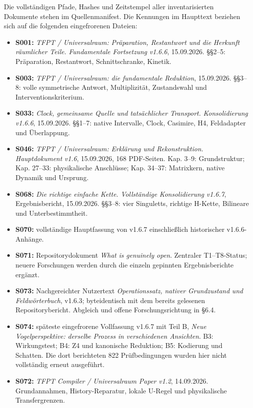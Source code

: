 Die vollständigen Pfade, Hashes und Zeitstempel aller inventarisierten
Dokumente stehen im Quellenmanifest. Die Kennungen im Haupttext beziehen
sich auf die folgenden eingefrorenen Dateien:

\begin{itemize}
\tightlist
\item
  \textbf{S001:} \emph{TFPT / Universalraum: Präparation, Restantwort
  und die Herkunft räumlicher Teile. Fundamentale Fortsetzung v1.6.6},
  15.09.2026. §§2--5: Präparation, Restantwort, Schnittschranke,
  Kinetik.
\item
  \textbf{S003:} \emph{TFPT / Universalraum: die fundamentale
  Reduktion}, 15.09.2026. §§3--8: volle symmetrische Antwort,
  Multiplizität, Zustandswahl und Interventionskriterium.
\item
  \textbf{S033:} \emph{Clock, gemeinsame Quelle und tatsächlicher
  Transport. Konsolidierung v1.6.6}, 15.09.2026. §§1--7: native
  Intervalle, Clock, Casimire, H4, Feldadapter und Überlappung.
\item
  \textbf{S046:} \emph{TFPT / Universalraum: Erklärung und
  Rekonstruktion. Hauptdokument v1.6}, 15.09.2026, 168 PDF-Seiten. Kap.
  3--9: Grundstruktur; Kap. 27--33: physikalische Anschlüsse; Kap.
  34--37: Matrixkern, native Dynamik und Ursprung.
\item
  \textbf{S068:} \emph{Die richtige einfache Kette. Vollständige
  Konsolidierung v1.6.7}, Ergebnisbericht, 15.09.2026. §§3--8: vier
  Singuletts, richtige H-Kette, Bilineare und Unterbestimmtheit.
\item
  \textbf{S070:} vollständige Hauptfassung von v1.6.7 einschließlich
  historischer v1.6.6-Anhänge.
\item
  \textbf{S071:} Repositorydokument \emph{What is genuinely open}.
  Zentraler T1--T8-Status; neuere Forschungen werden durch die einzeln
  gepinnten Ergebnisberichte ergänzt.
\item
  \textbf{S073:} Nachgereichter Nutzertext \emph{Operationssatz, nativer
  Grundzustand und Feldwörterbuch}, v1.6.3; byteidentisch mit dem
  bereits gelesenen Repositorybericht. Abgleich und offene
  Forschungsrichtung in §6.4.
\item
  \textbf{S074:} späteste eingefrorene Vollfassung v1.6.7 mit Teil B,
  \emph{Neue Vogelperspektive: derselbe Prozess in verschiedenen
  Ansichten}. B3: Wirkungstest; B4: Z4 und kanonische Reduktion; B5:
  Kodierung und Schatten. Die dort berichteten 822 Prüfbedingungen
  wurden hier nicht vollständig erneut ausgeführt.
\item
  \textbf{S072:} \emph{TFPT Compiler / Universalraum Paper v1.2},
  14.09.2026. Grundannahmen, History-Reparatur, lokale U-Regel und
  physikalische Transfergrenzen.
\end{itemize}

